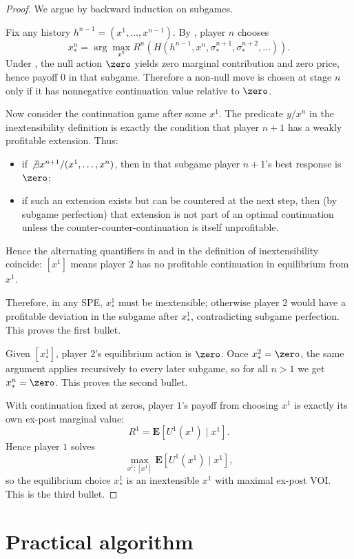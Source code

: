 \begin{proof}
We argue by backward induction on subgames.

Fix any history $h^{n-1}=(x^1,\dots,x^{n-1})$. By , player $n$ chooses
\[
x^n_*=\arg\max_{x^n}R^n(H(h^{n-1},x^n,\sigma_*^{n+1},\sigma_*^{n+2},\dots)).
\]
Under , the null action $\zero$ yields zero marginal contribution and zero price, hence payoff $0$ in that subgame. Therefore a non-null move is chosen at stage $n$ only if it has nonnegative continuation value relative to $\zero$.

Now consider the continuation game after some $x^1$. The predicate $y/x^n$ in the inextensibility definition is exactly the condition that player $n\!+\!1$ has a weakly profitable extension. Thus:
\begin{itemize}
\item if $\not\exists x^{n+1}/(x^1,\dots,x^n)$, then in that subgame player $n\!+\!1$'s best response is $\zero$;
\item if such an extension exists but can be countered at the next step, then (by subgame perfection) that extension is not part of an optimal continuation unless the counter-counter-continuation is itself unprofitable.
\end{itemize}
Hence the alternating quantifiers in  and in the definition of inextensibility coincide: $[x^1]$ means player $2$ has no profitable continuation in equilibrium from $x^1$.

Therefore, in any SPE, $x^1_*$ must be inextensible; otherwise player $2$ would have a profitable deviation in the subgame after $x^1_*$, contradicting subgame perfection. This proves the first bullet.

Given $[x^1_*]$, player $2$'s equilibrium action is $\zero$. Once $x^2_*=\zero$, the same argument applies recursively to every later subgame, so for all $n>1$ we get $x^n_*=\zero$. This proves the second bullet.

With continuation fixed at zeros, player $1$'s payoff from choosing $x^1$ is exactly its own ex-post marginal value:
\[
R^1=\mathbf{E}[U^1(x^1)\mid x^1].
\]
Hence player $1$ solves
\[
\max_{x^1:[x^1]}\mathbf{E}[U^1(x^1)\mid x^1],
\]
so the equilibrium choice $x^1_*$ is an inextensible $x^1$ with maximal ex-post VOI. This is the third bullet.
\end{proof}

\section{Practical algorithm}
\label{infonomy:sec:practical}

